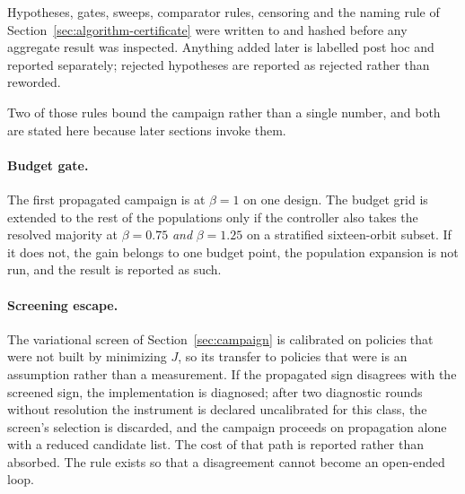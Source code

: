 Hypotheses, gates, sweeps, comparator rules, censoring and the naming rule of
Section~\ref{sec:algorithm-certificate} were written to
 and hashed before any aggregate result was inspected.
Anything added later is labelled post hoc and reported separately; rejected
hypotheses are reported as rejected rather than reworded. 

Two of those rules bound the campaign rather than a single number, and both are
stated here because later sections invoke them.

\paragraph{Budget gate.} The first propagated campaign is at $\beta=1$ on one
design. The budget grid is extended to the rest of the populations only if the
controller also takes the resolved majority at $\beta=0.75$ \emph{and}
$\beta=1.25$ on a stratified sixteen-orbit subset. If it does not, the gain
belongs to one budget point, the population expansion is not run, and the
result is reported as such.

\paragraph{Screening escape.} The variational screen of
Section~\ref{sec:campaign} is calibrated on policies that were not built by
minimizing $J$, so its transfer to policies that were is an assumption rather
than a measurement. If the propagated sign disagrees with the screened sign,
the implementation is diagnosed; after two diagnostic rounds without
resolution the instrument is declared uncalibrated for this class, the screen's
selection is discarded, and the campaign proceeds on propagation alone with a
reduced candidate list. The cost of that path is reported rather than absorbed.
The rule exists so that a disagreement cannot become an open-ended loop.
